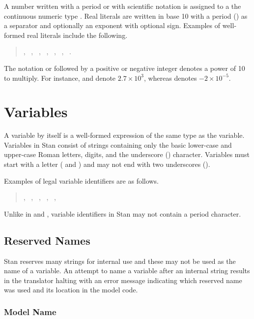 A number written with a period or with scientific notation is assigned
to a the continuous numeric type .  Real literals are
written in base 10 with a period () as a separator and
optionally an exponent with optional sign.  Examples
of well-formed real literals include the following.
%
\begin{quote}
, \ , \ , \ , \
, \ , \ .
\end{quote}
%
The notation  or  followed by a positive or negative
integer denotes a power of 10 to multiply.  For instance, 
and \code{2.7e+3} denote $2.7 \times 10^3$, whereas \code{-2E-5} denotes $-2 \times
10^{-5}$.


\section{Variables}\label{variables.section}

A variable by itself is a well-formed expression of the same type as
the variable.  Variables in Stan consist of \ASCII strings containing
only the basic lower-case and upper-case Roman letters, digits, and
the underscore (\code{\_}) character.  Variables must start with a
letter (\code{a--z} and \code{A--Z}) and may not end with two underscores
(\code{\_\_}).

Examples of legal variable identifiers are as follows.
%
\begin{quote}
,
\ ,
\ ,
\ ,
\ ,
\ 
\end{quote}
%
Unlike in \R and \BUGS, variable identifiers in Stan may not contain
a period character.

\subsection{Reserved Names}

Stan reserves many strings for internal use and these may not be used
as the name of a variable.  An attempt to name a variable after an
internal string results in the \code{stanc} translator halting with an
error message indicating which reserved name was used and its location
in the model code.

\subsubsection{Model Name}

